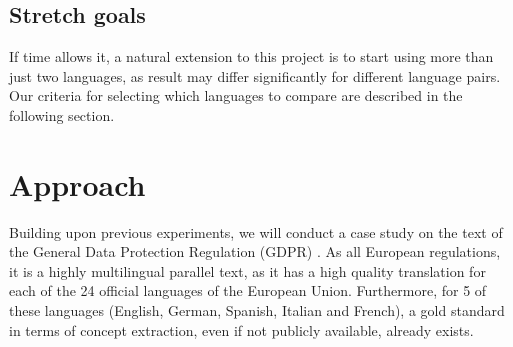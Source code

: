 \documentclass{article}
\begin{document}
\subsection{Stretch goals}
If time allows it, a natural extension to this project is to start using more than just two languages, as result may differ significantly for different language pairs. Our criteria for selecting which languages to compare are described in the following section.

\section{Approach}
Building upon previous experiments, we will conduct a case study on the text of the General Data Protection Regulation (GDPR) \cite{gdpr}.
As all European regulations, it is a highly multilingual parallel text, as it has a high quality translation for each of the 24 official languages of the European Union.
Furthermore, for 5 of these languages (English, German, Spanish, Italian and French), a gold standard in terms of concept extraction, even if not publicly available, already exists.
\end{document}
